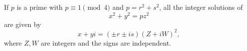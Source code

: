 \begin{proposition}\label{eq:009}
    If $p$ is a prime with $p\equiv1\pmod4$ and $p=r^2+s^2$, all the integer solutions of
\[
    x^2+y^2=pz^2
\]
    are given by
\[
    x+yi=(\pm r\pm is)(Z+iW)^2,
\]
    where $Z,W$ are integers and the signs are independent.
\end{proposition}
